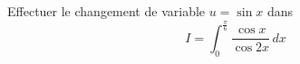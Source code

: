 Effectuer le changement de variable $u=\sin x$ dans
\begin{displaymath}
 I=\int_{0}^{\frac{\pi}{6}}\frac{\cos x}{\cos 2x}\,dx
\end{displaymath}
\bigskip \bigskip
